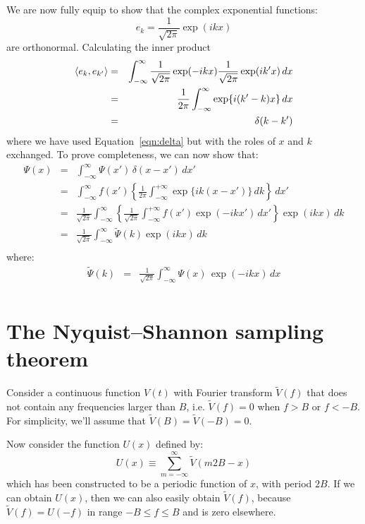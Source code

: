 \documentclass[12pt,oneside]{book}
\begin{document}
We are now fully equip to show that the complex exponential functions:
\begin{equation*}
e_k = \frac{1}{\sqrt{2\pi}} \exp(i k x)
\end{equation*}
are orthonormal.  Calculating the inner product
\begin{eqnarray*}
\braket{e_k, e_{k'}} &=& \int_{-\infty}^{\infty} \frac{1}{\sqrt{2 \pi}}  \exp(-ikx) \frac{1}{\sqrt{2 \pi}}  \exp(ik'x) \, dx \\
                               &=& \frac{1}{2 \pi} \int_{-\infty}^{\infty} \exp\{i(k'-k)x\} \, dx \\
                               &=& \delta(k-k')
\end{eqnarray*}
where we have used Equation~\ref{eqn:delta} but with the roles of $x$ and $k$ exchanged.
To prove completeness, we can now show that:
\begin{eqnarray*}
\Psi(x) &=& \int_{-\infty}^{\infty} \Psi(x') \, \delta(x-x') \, dx' \\
&=& \int_{-\infty}^{\infty} f(x') \left\{ \frac{1}{2 \pi} \int_{-\infty}^{+\infty} \exp\{ik(x-x')\} \, dk \right\} \, dx' \\
&=& \frac{1}{\sqrt{2 \pi}} \int_{-\infty}^{\infty} \left\{ \frac{1}{\sqrt{2 \pi}} \int_{-\infty}^{+\infty} f(x') \exp(-ikx') \, dx' \right\}  \exp(ikx) \, dk \\
&=& \frac{1}{\sqrt{2 \pi}} \int_{-\infty}^{\infty} \widetilde{\Psi}(k)  \exp(ikx) \, dk \\
\end{eqnarray*}
where:
\begin{eqnarray*}
\widetilde{\Psi}(k) &=& \frac{1}{\sqrt{2\pi}} \int_{-\infty}^{\infty} \Psi(x) \, \exp(-ikx) \, dx \\
\end{eqnarray*}

\section{The Nyquist--Shannon sampling theorem}

Consider a continuous function $V(t)$ with Fourier transform $\widetilde{V}(f)$ that does not contain any frequencies larger than $B$, i.e. $\widetilde{V}(f) = 0$  when $f>B$ or $f<-B$.  For simplicity, we'll assume that $\widetilde{V}(B) = \widetilde{V}(-B) = 0$.

Now consider the function $U(x)$ defined by:
\begin{displaymath}
U(x) \equiv \sum_{m=-\infty}^{\infty} \widetilde{V}(m2B-x)
\end{displaymath}
which has been constructed to be a periodic function of $x$, with period $2B$.
If we can obtain $U(x)$, then we can also easily obtain $\widetilde{V}(f)$, because $\widetilde{V}(f) = U(-f)$ in range $-B \leq f \leq B$ and is zero elsewhere.
\end{document}
